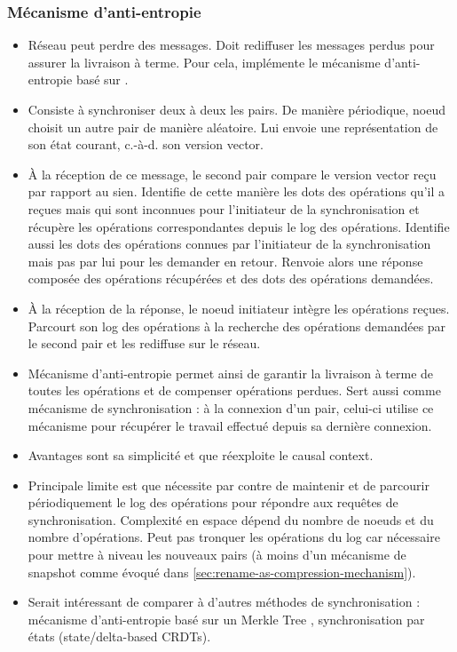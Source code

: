 \documentclass[12pt]{thesul}
\newcommand{\ie}{c.-à-d. }
\begin{document}
\subsubsection{Mécanisme d'anti-entropie}

\begin{itemize}
  \item Réseau peut perdre des messages.
    Doit rediffuser les messages perdus pour assurer la livraison à terme.
    Pour cela, implémente le mécanisme d'anti-entropie basé sur \cite{1983-anti-entropy-vv}.
  \item Consiste à synchroniser deux à deux les pairs.
    De manière périodique, noeud choisit un autre pair de manière aléatoire.
    Lui envoie une représentation de son état courant, \ie son version vector.
  \item À la réception de ce message, le second pair compare le version vector reçu par rapport au sien.
    Identifie de cette manière les dots des opérations qu'il a reçues mais qui sont inconnues pour l'initiateur de la synchronisation et récupère les opérations correspondantes depuis le log des opérations.
    Identifie aussi les dots des opérations connues par l'initiateur de la synchronisation mais pas par lui pour les demander en retour.
    Renvoie alors une réponse composée des opérations récupérées et des dots des opérations demandées.
  \item À la réception de la réponse, le noeud initiateur intègre les opérations reçues.
    Parcourt son log des opérations à la recherche des opérations demandées par le second pair et les rediffuse sur le réseau.
  \item Mécanisme d'anti-entropie permet ainsi de garantir la livraison à terme de toutes les opérations et de compenser opérations perdues.
    Sert aussi comme mécanisme de synchronisation : à la connexion d'un pair, celui-ci utilise ce mécanisme pour récupérer le travail effectué depuis sa dernière connexion.
  \item Avantages sont sa simplicité et que réexploite le causal context.
  \item Principale limite est que nécessite par contre de maintenir et de parcourir périodiquement le log des opérations pour répondre aux requêtes de synchronisation.
    Complexité en espace dépend du nombre de noeuds et du nombre d'opérations.
    Peut pas tronquer les opérations du log car nécessaire pour mettre à niveau les nouveaux pairs (à moins d'un mécanisme de snapshot comme évoqué dans \autoref{sec:rename-as-compression-mechanism}).
  \item Serait intéressant de comparer à d'autres méthodes de synchronisation : mécanisme d'anti-entropie basé sur un Merkle Tree , synchronisation par états (state/delta-based \acp{CRDT}).
\end{itemize}
\end{document}
